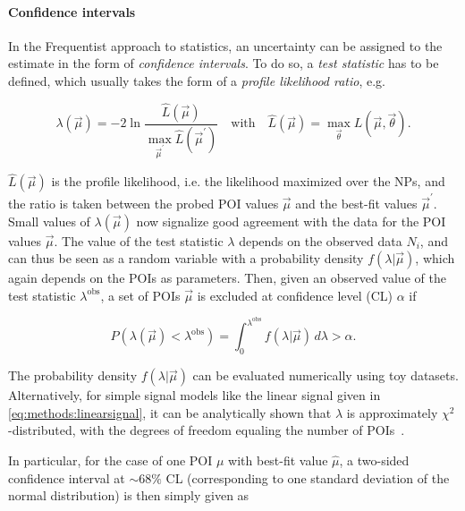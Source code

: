\paragraph{Confidence intervals}

In the Frequentist approach to statistics, an uncertainty can be assigned to the estimate in the form of \textit{confidence intervals}. To do so, a \textit{test statistic} has to be defined, which usually takes the form of a \textit{profile likelihood ratio}, e.g.~\cite{Cowan:2010js}

\begin{equation}
\label{eq:methods:teststat}
    \lambda (\vec{\mu}) = - 2 \ln \frac { \hat{L} (\vec{\mu}) } { \max_{\vec{\mu}^\prime} \hat{L} (\vec{\mu}^\prime) } 
    \quad \text{with} \quad 
    \hat{L} (\vec{\mu}) = \max_{\vec{\theta}} L (\vec{\mu}, \vec{\theta}).
\end{equation}

$\hat{L} (\vec{\mu})$ is the profile likelihood, i.e. the likelihood maximized over the NPs, and the ratio is taken between the probed POI values $\vec{\mu}$ and the best-fit values $\vec{\mu}^\prime$. Small values of $ \lambda (\vec{\mu})$ now signalize good agreement with the data for the POI values $\vec{\mu}$. The value of the test statistic $\lambda$ depends on the observed data $N_i$, and can thus be seen as a random variable with a probability density $f(\lambda | \vec{\mu})$, which again depends on the POIs as parameters. Then, given an observed value of the test statistic $\lambda^{\mathrm{obs}}$, a set of POIs $\vec{\mu}$ is excluded at confidence level (CL) $\alpha$ if 

\begin{equation}
\label{eq:methods:cl}
    P \left( \lambda (\vec{\mu}) < \lambda^{\mathrm{obs}} \right) = \int_0^{\lambda^{\mathrm{obs}}} f(\lambda | \vec{\mu}) \, d\lambda > \alpha.
\end{equation}

The probability density $f(\lambda | \vec{\mu})$ can be evaluated numerically using toy datasets. Alternatively, for simple signal models like the linear signal given in \cref{eq:methods:linearsignal}, it can be analytically shown that $\lambda$ is approximately $\chi^2$-distributed, with the degrees of freedom equaling the number of POIs~\cite{Wilks:1938dza,Wald:1943}.%

In particular, for the case of one POI $\mu$ with best-fit value $\hat{\mu}$, a two-sided confidence interval at $\sim 68\%$ CL (corresponding to one standard deviation of the normal distribution) is then simply given as~\cite{Cowan:2010js}

